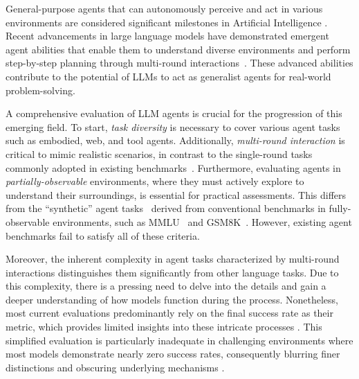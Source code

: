 
General-purpose agents that can autonomously perceive and act in various environments are considered significant milestones in Artificial Intelligence \citep{russell2005ai}. Recent advancements in large language models \citep{openai2023gpt, touvron2023llama} have demonstrated emergent agent abilities that enable them to understand diverse environments and perform step-by-step planning through multi-round interactions~\citep{yao2022react, song2023llm}. These advanced abilities contribute to the potential of LLMs to act as generalist agents for real-world problem-solving. 

A comprehensive evaluation of LLM agents is crucial for the progression of this emerging field. To start, \emph{task diversity} is necessary to cover various agent tasks such as embodied, web, and tool agents. Additionally, \emph{multi-round interaction} is critical to mimic realistic scenarios, in contrast to the single-round tasks commonly adopted in existing benchmarks~\citep{xu2023tool, lin2023llm, qin2023tool}. Furthermore, evaluating agents in \emph{partially-observable} environments, where they must actively explore to understand their surroundings, is essential for practical assessments. This differs from the ``synthetic'' agent tasks~\citep{wang2023mint} derived from conventional benchmarks in fully-observable environments, such as MMLU~\citep{lanham2023measuring} and GSM8K~\citep{cobbe2021gsm8k}. 
However, existing agent benchmarks fail to satisfy all of these criteria.

Moreover, the inherent complexity in agent tasks 
characterized by multi-round interactions 
distinguishes them significantly from other language tasks. 
Due to this complexity, there is a pressing need to delve into the details and gain a deeper understanding of how models function during the process.
Nonetheless, most current evaluations predominantly rely on the final success rate as their metric, which provides limited insights into these intricate processes \citep{liu2023agentbench, wang2023mint, yao2022react, liu2023bolaa, mialon2023gaia}. This simplified evaluation is particularly inadequate in challenging environments where most models demonstrate nearly zero success rates, consequently blurring finer distinctions and obscuring underlying mechanisms \citep{liu2023agentbench}. 

